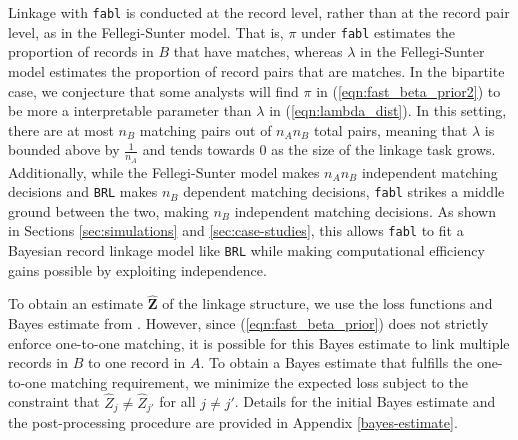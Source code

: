 \documentclass[ba]{imsart}
\begin{document}
Linkage with \texttt{fabl} is conducted at the record level, rather than at the record pair level, as in the Fellegi-Sunter model. That is, $\pi$ under \texttt{fabl} estimates the proportion of records in $B$ that have matches, whereas $\lambda$ in the Fellegi-Sunter model estimates the proportion of record pairs that are matches. In the bipartite case, we conjecture that some analysts will find $\pi$ in (\ref{eqn:fast_beta_prior2}) to be more a interpretable parameter than $\lambda$ in (\ref{eqn:lambda_dist}). In this setting, there are at most $n_B$ matching pairs out of $n_A n_B$ total pairs, meaning that $\lambda$ is bounded above by $\frac{1}{n_A}$ and tends towards 0 as the size of the linkage task grows. Additionally, while the Fellegi-Sunter model makes $n_A  n_B$ independent matching decisions and \texttt{BRL} makes $n_B$ dependent matching decisions, \texttt{fabl} strikes a middle ground between the two, making $n_B$  independent matching decisions. As shown in Sections \ref{sec:simulations} and \ref{sec:case-studies}, this allows \texttt{fabl} to fit a Bayesian record linkage model like \texttt{BRL} while making computational efficiency gains possible by exploiting independence. 

To obtain an estimate $\hat{\bm{Z}}$ of the linkage structure, we use the loss functions and Bayes estimate from \cite{sadinle_bayesian_2017}. However, since (\ref{eqn:fast_beta_prior}) does not strictly enforce one-to-one matching, it is possible for this Bayes estimate to link multiple records in $B$ to one record in $A$. To obtain a Bayes estimate that fulfills the one-to-one matching requirement, we minimize the expected loss subject to the constraint that $\hat{Z}_j \neq \hat{Z}_{j'}$ for all $j \neq j'$. Details for the initial Bayes estimate and the post-processing procedure are provided in Appendix \ref{bayes-estimate}.
\end{document}
